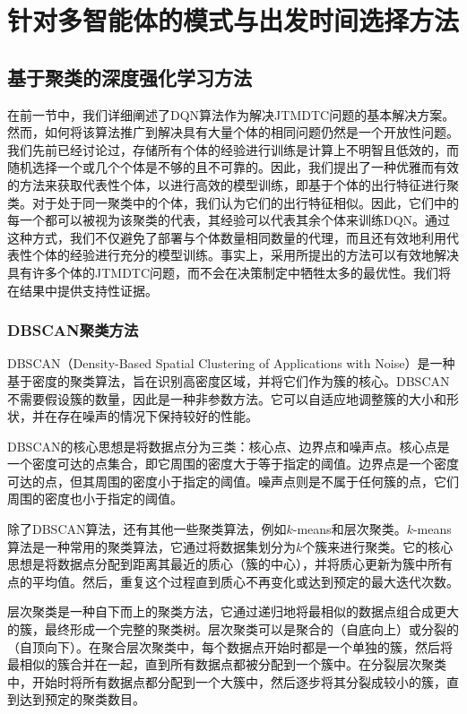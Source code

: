 \chapter{针对多智能体的模式与出发时间选择方法}
\label{chp:bib}

\section{基于聚类的深度强化学习方法}

在前一节中，我们详细阐述了DQN算法作为解决JTMDTC问题的基本解决方案。然而，如何将该算法推广到解决具有大量个体的相同问题仍然是一个开放性问题。我们先前已经讨论过，存储所有个体的经验进行训练是计算上不明智且低效的，而随机选择一个或几个个体是不够的且不可靠的。因此，我们提出了一种优雅而有效的方法来获取代表性个体，以进行高效的模型训练，即基于个体的出行特征进行聚类。对于处于同一聚类中的个体，我们认为它们的出行特征相似。因此，它们中的每一个都可以被视为该聚类的代表，其经验可以代表其余个体来训练DQN。通过这种方式，我们不仅避免了部署与个体数量相同数量的代理，而且还有效地利用代表性个体的经验进行充分的模型训练。事实上，采用所提出的方法可以有效地解决具有许多个体的JTMDTC问题，而不会在决策制定中牺牲太多的最优性。我们将在结果中提供支持性证据。



\subsection{DBSCAN聚类方法}
DBSCAN（Density-Based Spatial Clustering of Applications with Noise）是一种基于密度的聚类算法，旨在识别高密度区域，并将它们作为簇的核心。DBSCAN不需要假设簇的数量，因此是一种非参数方法。它可以自适应地调整簇的大小和形状，并在存在噪声的情况下保持较好的性能。

DBSCAN的核心思想是将数据点分为三类：核心点、边界点和噪声点。核心点是一个密度可达的点集合，即它周围的密度大于等于指定的阈值。边界点是一个密度可达的点，但其周围的密度小于指定的阈值。噪声点则是不属于任何簇的点，它们周围的密度也小于指定的阈值。

除了DBSCAN算法，还有其他一些聚类算法，例如$k$-means和层次聚类。$k$-means算法是一种常用的聚类算法，它通过将数据集划分为$k$个簇来进行聚类。它的核心思想是将数据点分配到距离其最近的质心（簇的中心），并将质心更新为簇中所有点的平均值。然后，重复这个过程直到质心不再变化或达到预定的最大迭代次数。

层次聚类是一种自下而上的聚类方法，它通过递归地将最相似的数据点组合成更大的簇，最终形成一个完整的聚类树。层次聚类可以是聚合的（自底向上）或分裂的（自顶向下）。在聚合层次聚类中，每个数据点开始时都是一个单独的簇，然后将最相似的簇合并在一起，直到所有数据点都被分配到一个簇中。在分裂层次聚类中，开始时将所有数据点都分配到一个大簇中，然后逐步将其分裂成较小的簇，直到达到预定的聚类数目。

